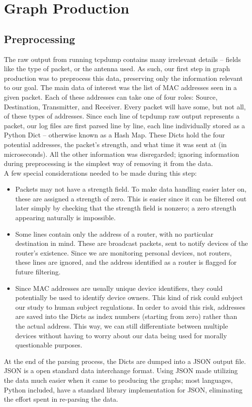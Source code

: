 \documentclass[12pt,journal,compsoc]{IEEEtran}
\begin{document}
\section{Graph Production}

\subsection*{Preprocessing}

	The raw output from running tcpdump contains many irrelevant details -- fields like the type of packet, or the antenna used.
	As such, our first step in graph production was to preprocess this data, preserving only the information relevant to our goal.
    The main data of interest was the list of MAC addresses seen in a given packet.
    Each of these addresses can take one of four roles: Source, Destination, Transmitter, and Receiver.
    Every packet will have some, but not all, of these types of addresses.
    Since each line of tcpdump raw output represents a packet, our log files are first parsed line by line, each line individually stored as a Python Dict -- otherwise known as a Hash Map.
    These Dicts hold the four potential addresses, the packet's strength, and what time it was sent at (in microseconds).
    All the other information was disregarded; ignoring information during preprocessing is the simplest way of removing it from the data.\\
    A few special considerations needed to be made during this step:
    \begin{itemize}
    \item Packets may not have a strength field.
      To make data handling easier later on, these are assigned a strength of zero.
      This is easier since it can be filtered out later simply by checking that the strength field is nonzero; a zero strength appearing naturally is impossible. 
    \item Some lines contain only the address of a router, with no particular destination in mind.
      These are broadcast packets, sent to notify devices of the router's existence.
      Since we are monitoring personal devices, not routers, these lines are ignored, and the address identified as a router is flagged for future filtering.
    \item Since MAC addresses are usually unique device identifiers, they could potentially be used to identify device owners.
      This kind of risk could subject our study to human subject regulations.
      In order to avoid this risk, addresses are saved into the Dicts as index numbers (starting from zero) rather than the actual address.
      This way, we can still differentiate between multiple devices without having to worry about our data being used for morally questionable purposes.
    \end{itemize}
    At the end of the parsing process, the Dicts are dumped into a JSON output file.
    JSON is a open standard data interchange format.
    Using JSON made utilizing the data much easier when it came to producing the graphs; most languages, Python included, have a standard library implementation for JSON, eliminating the effort spent in re-parsing the data.
\end{document}
